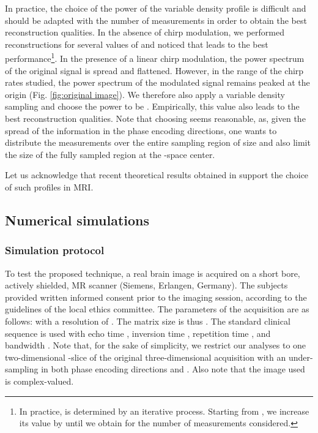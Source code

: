 \documentclass[10pt,draftcls, onecolumn]{IEEEtran}
\begin{document}
In practice, the choice of the power  of the variable density profile is difficult and should be adapted with the number of measurements in order to obtain the best reconstruction qualities. In the absence of chirp modulation, we performed reconstructions for several values of  and noticed that  leads to the best performance\footnote{In practice,  is determined by an iterative process. Starting from , we increase its value by  until we obtain  for the number of measurements considered.}. In the presence of a linear chirp modulation, the power spectrum of the original signal is spread and flattened. However, in the range of the chirp rates studied, the power spectrum of the modulated signal remains peaked at the origin (Fig. \ref{fig:original image}). We therefore also apply a variable density sampling and choose the power  to be . Empirically, this value also leads to the best reconstruction qualities. Note that choosing  seems reasonable, as, given the spread of the information in the phase encoding directions, one wants to distribute the measurements over the entire sampling region of size  and also limit the size of the fully sampled region at the -space center. 

Let us acknowledge that recent theoretical results obtained in \cite{puy11c} support the choice of such profiles in MRI.

\subsection{Numerical simulations}
\label{sub:simulations}

\subsubsection{Simulation protocol}

To test the proposed technique, a real brain image is acquired on a  short bore, actively shielded, MR scanner (Siemens, Erlangen, Germany). The subjects provided written informed consent prior to the imaging session, according to the guidelines of the local ethics committee. The parameters of the acquisition are as follows:  with a resolution of . The matrix size is thus . The standard clinical  sequence is used with echo time , inversion time , repetition time , and bandwidth . Note that, for the sake of simplicity, we restrict our analyses to one two-dimensional -slice of the original three-dimensional acquisition with an under-sampling in both phase encoding directions  and . Also note that the image used is complex-valued.
\end{document}
